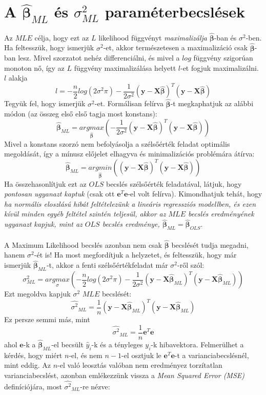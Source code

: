 \documentclass[14p]{report}
\def\pmb{\boldsymbol}
\def\ebeta{\hat{\pmb{\beta}}}
\newcounter{x}
\newcounter{y}
\newcounter{z}
\begin{document}
	\section{A $\ebeta_{ML}$ és $\sigma^2_{ML}$ paraméterbecslések}
	Az $MLE$ célja, hogy ezt az $L$ likelihood függvényt \emph{maximalizálja} $\ebeta$-ban és $\sigma^2$-ben. Ha feltesszük, hogy ismerjük $\sigma^2$-et, akkor természetesen a maximalizáció csak $\ebeta$-ban lesz. Mivel szorzatot nehéz differenciálni, és mivel a $log$ függvény szigorúan monoton nő, így az $L$ függvény maximalizálása helyett $l$-et fogjuk maximalizálni. $l$ alakja
	\[
		l = -\frac{n}{2}log(2\sigma^2\pi) - \frac{1}{2\sigma^2}(\pmb{y} - \pmb{X}\ebeta)^T(\pmb{y} - \pmb{X}\ebeta)
	\]
	Tegyük fel, hogy ismerjük $\sigma^2$-et. Formálisan felírva $\ebeta$-t megkaphatjuk az alábbi módon (az összeg első első tagja most konstans):
	\[
		\ebeta_{ML} = \underset{\ebeta}{argmax}\left(
			-\frac{1}{2\sigma^2}(\pmb{y} - \pmb{X}\ebeta)^T(\pmb{y} - \pmb{X}\ebeta)
		\right)
	\]
	Mivel a konstans szorzó nem befolyásolja a szélsőérték feladat optimális megoldását, így a mínusz előjelet elhagyva és minimalizációs problémára átírva:
	\[
		\ebeta_{ML} = \underset{\ebeta}{argmin}\left(
			(\pmb{y} - \pmb{X}\ebeta)^T(\pmb{y} - \pmb{X}\ebeta)
		\right)
	\]
	Ha összehasonlítjuk ezt az $OLS$ becslés szélsőérték feladatával, látjuk, hogy \emph{pontosan ugyanazt kaptuk} (csak ott $\pmb{e}^T\pmb{e}$-el volt felírva). Kimondhatjuk tehát, hogy \emph{ha normális eloszlású hibát feltételezünk a lineáris regressziós modellben, és ezen kívül minden egyéb feltétel szintén teljesül, akkor az $MLE$ becslés eredményének ugyanazt kapjuk, mint az $OLS$ becslés eredménye, $\ebeta_{ML} = \ebeta_{OLS}$}.
	\\
	\\
	A Maximum Likelihood becslés azonban nem csak $\ebeta$ becslését tudja megadni, hanem $\sigma^2$-ét is! Ha most megfordítjuk a helyzetet, és feltesszük, hogy már ismerjük $\ebeta_{ML}$-t, akkor a fenti szélsőértékfeladat már $\sigma^2$-ről szól:
	\[
		\sigma^2_{ML} = \underset{\sigma}{argmax}\left(
		-\frac{n}{2}log(2\sigma^2\pi) - \frac{1}{2\sigma^2}(\pmb{y} - \pmb{X}\ebeta_{ML})^T(\pmb{y} - \pmb{X}\ebeta_{ML})
		\right)
	\]
	Ezt megoldva kapjuk $\sigma^2$ $MLE$ becslését:
	\[
		\widehat{\sigma^2}_{ML} = \frac{1}{n}(\pmb{y} - \pmb{X}\ebeta_{ML})^T(\pmb{y} - \pmb{X}\ebeta_{ML})
	\]
	Ez persze semmi más, mint
	\[
		\widehat{\sigma^2}_{ML} = \frac{1}{n}\pmb{e}^T\pmb{e}
	\]
	ahol $\pmb{e}$-k a $\ebeta_{ML}$-el becsült $\hat{y}_i$-k és a tényleges $y_i$-k hibavektora. Felmerülhet a kérdés, hogy miért $n$-el, és nem $n-1$-el osztjuk le $\pmb{e}^T\pmb{e}$-t a varianciabecslésnél, mint eddig. Az $n$-el való leosztás valóban nem eredményez torzítatlan varianciabecslést, azonban emlékezzünk vissza a \emph{Mean Squared Error (MSE)} definíciójára, most $\widehat{\sigma^2}_{ML}$-re nézve:
\end{document}

